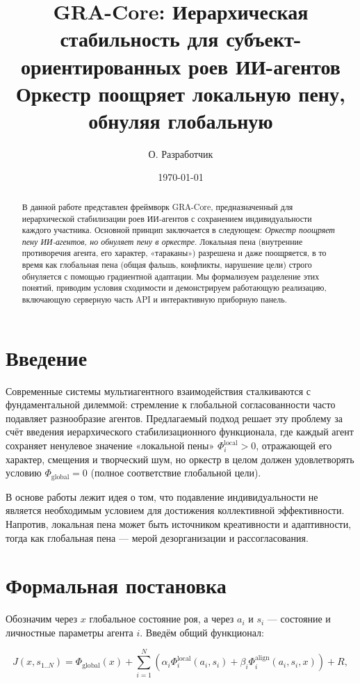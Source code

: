 \documentclass[twocolumn]{article}
\title{GRA-Core: Иерархическая стабильность для субъект-ориентированных роев ИИ-агентов \\
\large{Оркестр поощряет локальную пену, обнуляя глобальную}}
\author{О. Разработчик}
\date{\today}
\begin{document}
\maketitle

\begin{abstract}
В данной работе представлен фреймворк GRA-Core, предназначенный для иерархической стабилизации роев ИИ-агентов с сохранением индивидуальности каждого участника. Основной принцип заключается в следующем: \emph{Оркестр поощряет пену ИИ-агентов, но обнуляет пену в оркестре}. Локальная пена (внутренние противоречия агента, его характер, «тараканы») разрешена и даже поощряется, в то время как глобальная пена (общая фальшь, конфликты, нарушение цели) строго обнуляется с помощью градиентной адаптации. Мы формализуем разделение этих понятий, приводим условия сходимости и демонстрируем работающую реализацию, включающую серверную часть API и интерактивную приборную панель.
\end{abstract}

\section{Введение}
Современные системы мультиагентного взаимодействия сталкиваются с фундаментальной дилеммой: стремление к глобальной согласованности часто подавляет разнообразие агентов. Предлагаемый подход решает эту проблему за счёт введения иерархического стабилизационного функционала, где каждый агент сохраняет ненулевое значение «локальной пены» $\Phi_i^{\text{local}}>0$, отражающей его характер, смещения и творческий шум, но оркестр в целом должен удовлетворять условию $\Phi_{\text{global}}=0$ (полное соответствие глобальной цели).

В основе работы лежит идея о том, что подавление индивидуальности не является необходимым условием для достижения коллективной эффективности. Напротив, локальная пена может быть источником креативности и адаптивности, тогда как глобальная пена — мерой дезорганизации и рассогласования.

\section{Формальная постановка}
Обозначим через $x$ глобальное состояние роя, а через $a_i$ и $s_i$ — состояние и личностные параметры агента $i$. Введём общий функционал:

\begin{equation}
J(x, s_{1..N}) = \Phi_{\text{global}}(x) + \sum_{i=1}^N \left( \alpha_i \Phi_i^{\text{local}}(a_i,s_i) + \beta_i \Phi_i^{\text{align}}(a_i,s_i,x) \right) + R,
\end{equation}
\end{document}
